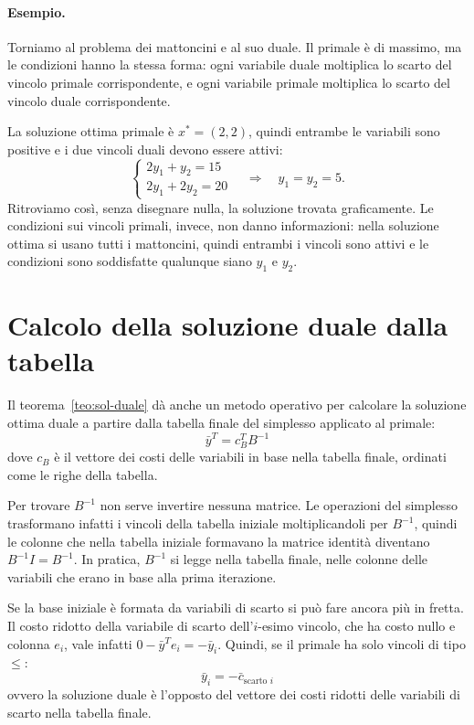 \paragraph{Esempio.}
Torniamo al problema dei mattoncini e al suo duale. Il primale è di massimo, ma le condizioni hanno la stessa forma: ogni variabile duale moltiplica lo scarto del vincolo primale corrispondente, e ogni variabile primale moltiplica lo scarto del vincolo duale corrispondente.

La soluzione ottima primale è $x^* = (2, 2)$, quindi entrambe le variabili sono positive e i due vincoli duali devono essere attivi:
\[
\begin{cases}
2y_1 + y_2 = 15 \\
2y_1 + 2y_2 = 20
\end{cases}
\quad\Longrightarrow\quad y_1 = y_2 = 5.
\]
Ritroviamo così, senza disegnare nulla, la soluzione trovata graficamente. Le condizioni sui vincoli primali, invece, non danno informazioni: nella soluzione ottima si usano tutti i mattoncini, quindi entrambi i vincoli sono attivi e le condizioni sono soddisfatte qualunque siano $y_1$ e $y_2$.

\section{Calcolo della soluzione duale dalla tabella}\label{sec:duale-tabella}
Il teorema~\ref{teo:sol-duale} dà anche un metodo operativo per calcolare la soluzione ottima duale a partire dalla tabella finale del simplesso applicato al primale:
\[
\bar{y}^T = c_B^T B^{-1}
\]
dove $c_B$ è il vettore dei costi delle variabili in base nella tabella finale, ordinati come le righe della tabella.

Per trovare $B^{-1}$ non serve invertire nessuna matrice. Le operazioni del simplesso trasformano infatti i vincoli della tabella iniziale moltiplicandoli per $B^{-1}$, quindi le colonne che nella tabella iniziale formavano la matrice identità diventano $B^{-1} I = B^{-1}$. In pratica, $B^{-1}$ si legge nella tabella finale, nelle colonne delle variabili che erano in base alla prima iterazione.

Se la base iniziale è formata da variabili di scarto si può fare ancora più in fretta. Il costo ridotto della variabile di scarto dell'$i$-esimo vincolo, che ha costo nullo e colonna $e_i$, vale infatti $0 - \bar{y}^T e_i = -\bar{y}_i$. Quindi, se il primale ha solo vincoli di tipo $\le$:
\[
\bar{y}_i = -\bar{c}_{\text{scarto } i}
\]
ovvero la soluzione duale è l'opposto del vettore dei costi ridotti delle variabili di scarto nella tabella finale.

